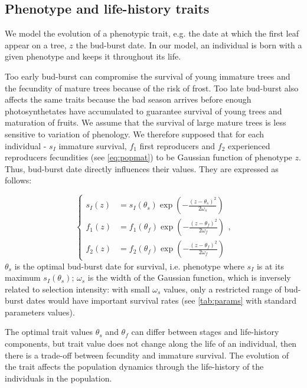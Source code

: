 \subsection*{Phenotype and life-history traits}

We model the evolution of a phenotypic trait, e.g. the date at which the first leaf appear on a tree, $z$ the bud-burst date. In our model, an individual is born with a given phenotype and keeps it throughout its life.

Too early bud-burst can compromise the survival of young immature trees and the fecundity of mature trees because of the risk of frost. Too late bud-burst also affects the same traits because the bad season arrives before enough photosynthetates have accumulated to guarantee survival of young trees and maturation of fruits. We assume that the survival of large mature trees is less sensitive to variation of phenology. We therefore supposed that for each individual - $s_{I}$ immature survival, $f_1$ first reproducers and $f_2$ experienced reproducers fecundities (see \autoref{eq:popmat}) to be Gaussian function of phenotype $z$. Thus, bud-burst date directly influences their values. They are expressed as follows:

\begin{equation}
	\label{eq:indlht}
	\left\{
	\begin{aligned}
	s_{I}(z) &= s_{I}(\theta_{s})	\exp\left(-\frac{(z - \theta_{s})^2}{2\omega_{s}}\right) \\
	f_1(z) &= f_1(\theta_{f})	\exp\left(-\frac{(z - \theta_{f})^2}{2\omega_{f}}\right) \\
	f_2(z) &= f_2(\theta_{f})	\exp\left(-\frac{(z - \theta_{f})^2}{2\omega_{f}}\right)
	\end{aligned}
	\right.,
\end{equation}
$\theta_s$ is the optimal bud-burst date for survival, i.e. phenotype where $s_I$ is at its maximum $s_I(\theta_s)$; $\omega_s$ is the width of the Gaussian function, which is inversely related to selection intensity: with small $\omega_s$ values, only a restricted range of bud-burst dates would have important survival rates (see \autoref{tab:params} with standard parameters values).

The optimal trait values $\theta_s$ and $\theta_f$ can differ between stages and life-history components, but trait value does not change along the life of an individual, then there is a trade-off between fecundity and immature survival. The evolution of the trait affects the population dynamics through the life-history of the individuals in the population.

